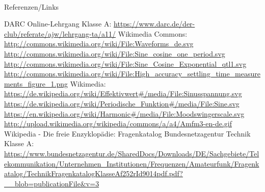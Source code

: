 \renewcommand{\refname}{Referenzen}

\hypertarget{refs}{}
\textcolor{white}{} \\ %
\Large Referenzen/Links
\footnotesize

\begin{thebibliography}{}
    DARC Online-Lehrgang Klasse A:
    \url{https://www.darc.de/der-club/referate/ajw/lehrgang-ta/a11/}
      Wikimedia Commons: \\
    \url{http://commons.wikimedia.org/wiki/File:Waveforms_de.svg}\\
    \url{http://commons.wikimedia.org/wiki/File:Sine_cosine_one_period.svg}\\
    \url{http://commons.wikimedia.org/wiki/File:Sine_Cosine_Exponential_qtl1.svg}\\
    \url{http://commons.wikimedia.org/wiki/File:High_accuracy_settling_time_measurements_figure_1.png}
    Wikimedia:\\
    \url{https://de.wikipedia.org/wiki/Effektivwert#/media/File:Sinusspannung.svg}\\
    \url{https://de.wikipedia.org/wiki/Periodische_Funktion#/media/File:Sine.svg}\\
    \url{https://en.wikipedia.org/wiki/Harmonic#/media/File:Moodswingerscale.svg}\\
    \url{http://upload.wikimedia.org/wikipedia/commons/a/a4/Amfm3-en-de.gif}\\
      Wikipedia - Die freie Enzyklopädie:
     Fragenkatalog Bundesnetzagentur Technik Klasse A:\\
    \url{https://www.bundesnetzagentur.de/SharedDocs/Downloads/DE/Sachgebiete/Telekommunikation/Unternehmen_Institutionen/Frequenzen/Amateurfunk/Fragenkatalog/TechnikFragenkatalogKlasseAf252rId9014pdf.pdf?__blob=publicationFile&v=3}

\end{thebibliography}


